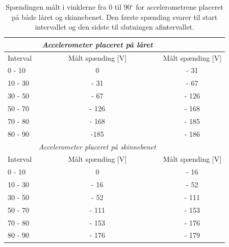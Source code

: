 \begin{table}[]
\centering
\begin{tabular}{|l|c|c|}
         & \textit{Accelerometer placeret på låret}                           & \multicolumn{1}{l}{}                      \\ \hline
Interval & Målt spænding {[}V{]}                                              & \multicolumn{1}{l}{Målt spænding {[}V{]}} \\ \hline
0 - 10   & 0                                                                  & - 31                                      \\ \hline
10 - 30  & - 31                                                               & - 67                                      \\ \hline
30 - 50  & - 67                                                               & - 126                                     \\ \hline
50 - 70  & - 126                                                              & - 168                                     \\ \hline
70 - 80  & - 168                                                              & - 185                                     \\
\hline
80 - 90  & -185                                                               & - 186                                     \\
\hline
         & \multicolumn{1}{l}{\textit{Accelerometer placeret på skinnebenet}} & \multicolumn{1}{l}{}                      \\ \hline
Interval & Målt spænding {[}V{]}                                              & \multicolumn{1}{l}{Målt spænding {[}V{]}} \\ \hline
0 - 10   & 0                                                                  & - 16                                      \\
\hline
10 - 30  & - 16                                                               & - 52                                      \\
\hline
30 - 50  & - 52                                                               & - 111                                     \\
\hline
50 - 70  & - 111                                                              & - 153                                     \\
\hline
70 - 80  & - 153                                                              & - 176                                     \\
\hline
80 - 90  & - 176                                                              & - 179    \\ \hline 
\end{tabular}
\caption{Spændingen målt i vinklerne fra 0 til 90$^{\circ}$ for accelerometrene placeret på både låret og skinnebenet. Den første spænding svarer til start intervallet og den sidste til slutningen afintervallet.}
\label{tab:vinkelinterval_psoc}        
\end{table}

